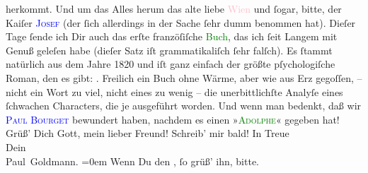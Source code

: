                herkommt. Und  um das Alles herum das alte liebe \textcolor{pink}{Wien}{}\ledrightnote{\textcolor{pink}{Wien}} und ſogar, bitte, der Kaiſer \textsc{\textcolor{blue}{Josef}{}\ledrightnote{\textcolor{blue}{Josef II.}}} (der ſich allerdings in der Sache ſehr dumm benommen hat).\pend
           \pstart
           Dieſer Tage ſende ich Dir auch  das erſte
               franzöſiſche \textcolor{green}{Buch}{}, das ich
               ſeit Langem mit Genuß geleſen habe (dieſer Satz iſt {\pb}grammatikaliſch ſehr falſch). Es ſtammt natürlich aus dem Jahre 1820 und iſt ganz einfach der größte pſychologiſche Roman, den es gibt:
                  \label{K_L02790-32v}\label{K_L02790-32h}.
               Freilich ein Buch ohne Wärme, aber wie aus Erz gegoſſen, – nicht ein Wort zu viel,
               nicht eines zu wenig – die unerbittlichſte Analyſe eines ſchwachen Characters, die je
               ausgeführt worden. Und wenn man bedenkt, daß \strikeout{\textcolor{gray}{m}} wir \strikeout{\textcolor{gray}{hinterher}}{ }{\pb}\textsc{\textcolor{blue}{Paul Bourget}{}\ledrightnote{\textcolor{blue}{Paul Bourget}}} bewundert haben, nachdem es einen »\textsc{\textcolor{green}{Adolphe}{}}« gegeben hat!\pend
           \pstart
           Grüß’ Dich Gott, mein lieber Freund!\pend
           \pstart
           Schreib’ mir bald!\pend
           \pstart
           In Treue {\\[\baselineskip]}Dein {\\[\baselineskip]}\spacefill\mbox{Paul Goldmann.}\pend
           \leftskip=0em{}\pstart
           \noindent{}Wenn Du den \label{K_L02790-24v}\label{K_L02790-24h}, ſo grüß’ ihn, bitte.\pend
           \endnumbering{}  
      